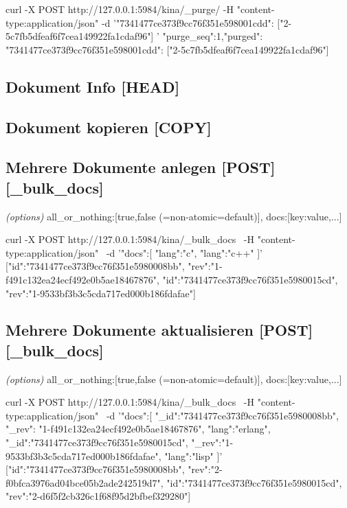 \documentclass[19pt,landscape,twocolumn]{article}
\newcommand{\htmlverb}[1]{{[}\textbf{{#1}}{]}}
\newcommand{\brackets}[1]{{[}{#1}{]}}
\begin{document}
\begin{code}
curl -X POST http://127.0.0.1:5984/kina/_purge/ 
  -H "content-type:application/json" 
  -d '{"7341477ce373f9cc76f351e598001cdd": 
        ["2-5c7fb5dfeaf6f7cea149922fa1cdaf96"]
     }'
{"purge_seq":1,"purged":{
  "7341477ce373f9cc76f351e598001cdd":
    ["2-5c7fb5dfeaf6f7cea149922fa1cdaf96"]
  }
}
\end{code}

\subsection{Dokument Info \htmlverb{HEAD}}

\subsection{Dokument kopieren \htmlverb{COPY}}

\subsection{Mehrere Dokumente anlegen \htmlverb{POST} \htmlverb{\_bulk\_docs}}
\emph{(options)} all\_or\_nothing:\brackets{true,false (=non-atomic=default)}, docs:\brackets{key:value,...}

\begin{code}
curl -X POST http://127.0.0.1:5984/kina/_bulk_docs \
  -H "content-type:application/json" \
  -d '{"docs":[
        {"lang":"c"}, 
        {"lang":"c++"}
     ]}'
[{"id":"7341477ce373f9cc76f351e5980008bb",
  "rev":"1-f491c132ea24ecf492e0b5ae18467876"},
 {"id":"7341477ce373f9cc76f351e5980015cd",
  "rev":"1-9533bf3b3c5cda717ed000b186fdafae"}]
\end{code}

\subsection{Mehrere Dokumente aktualisieren \htmlverb{POST} \htmlverb{\_bulk\_docs}}
\emph{(options)} all\_or\_nothing:\brackets{true,false (=non-atomic=default)}, docs:\brackets{key:value,...}

\begin{code}
curl -X POST http://127.0.0.1:5984/kina/_bulk_docs \
  -H "content-type:application/json" \
  -d '{"docs":[
        {"_id":"7341477ce373f9cc76f351e5980008bb",
         "_rev": "1-f491c132ea24ecf492e0b5ae18467876",
         "lang":"erlang"},
        {"_id":"7341477ce373f9cc76f351e5980015cd",
         "_rev":"1-9533bf3b3c5cda717ed000b186fdafae",
         "lang":"lisp"}
    ]}'
[{"id":"7341477ce373f9cc76f351e5980008bb",
  "rev":"2-f0bfca3976ad04bce05b2ade242519d7"},
 {"id":"7341477ce373f9cc76f351e5980015cd",
  "rev":"2-d6f5f2cb326c1f68f95d2bfbef329280"}]
\end{code}
\end{document}
